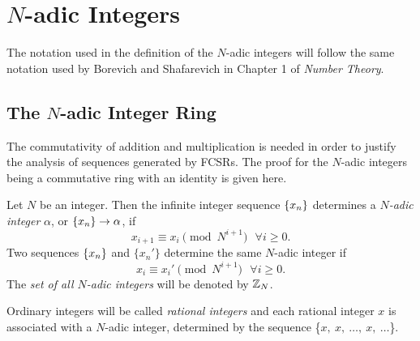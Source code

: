 \section{$N$-adic Integers}
\par The notation used in the definition of the $N$-adic integers will follow
the same notation used by Borevich and Shafarevich in Chapter 1 of
{\em Number Theory}.

\subsection{The $N$-adic Integer Ring}
\par The commutativity of addition and multiplication is needed in order to
justify the analysis of sequences generated by FCSRs. The proof for the $N$-adic
integers being a commutative ring with an identity is given here.
  
\begin{definition}
\label{def:N-adic}
  Let $N$ be an integer. Then the infinite integer sequence $\{x_n\}$
  determines a {\em $N$-adic integer} $\alpha$, or $\{x_n\} \rightarrow \alpha$, if
\begin{equation} \label{eq:seq}
  x_{i+1} \equiv x_i \pmod{N^{i+1}} \ \ \ \forall i \geq 0.
\end{equation}
  Two sequences $\{x_n\}$ and $\{x_n'\}$ determine the same $N$-adic integer
  if 
\begin{equation} \label{eq:equiv}
  x_i \equiv x_i' \pmod{N^{i+1}}\ \ \ \forall i \geq 0.
\end{equation}
  The {\em set of all $N$-adic integers} will be denoted by $\mathbb{Z}_N$.
\end{definition}

\par Ordinary integers will be called {\em rational integers} and each
rational integer $x$ is associated with a $N$-adic integer, determined
by the sequence \{$x,\ x, \ \dots, \ x,\ \dots$\}.
	
